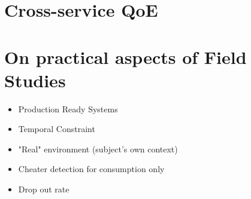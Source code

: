 
\section{Cross-service QoE}

\section{On practical aspects of Field Studies}
\begin{itemize}
\item Production Ready Systems
\item Temporal Constraint
\item "Real" environment (subject's own context)
\item Cheater detection for consumption only
\item Drop out rate
\end{itemize}